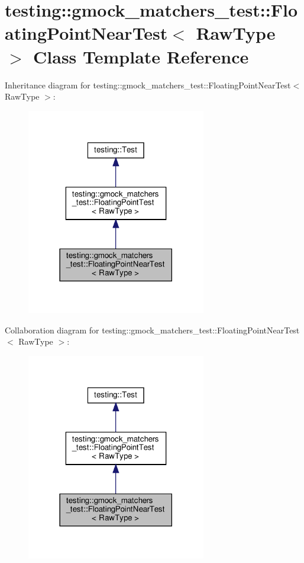\hypertarget{classtesting_1_1gmock__matchers__test_1_1_floating_point_near_test}{}\section{testing\+:\+:gmock\+\_\+matchers\+\_\+test\+:\+:Floating\+Point\+Near\+Test$<$ Raw\+Type $>$ Class Template Reference}
\label{classtesting_1_1gmock__matchers__test_1_1_floating_point_near_test}


Inheritance diagram for testing\+:\+:gmock\+\_\+matchers\+\_\+test\+:\+:Floating\+Point\+Near\+Test$<$ Raw\+Type $>$\+:
\nopagebreak
\begin{figure}[H]
\begin{center}
\leavevmode
\includegraphics[width=222pt]{classtesting_1_1gmock__matchers__test_1_1_floating_point_near_test__inherit__graph}
\end{center}
\end{figure}


Collaboration diagram for testing\+:\+:gmock\+\_\+matchers\+\_\+test\+:\+:Floating\+Point\+Near\+Test$<$ Raw\+Type $>$\+:
\nopagebreak
\begin{figure}[H]
\begin{center}
\leavevmode
\includegraphics[width=222pt]{classtesting_1_1gmock__matchers__test_1_1_floating_point_near_test__coll__graph}
\end{center}
\end{figure}
